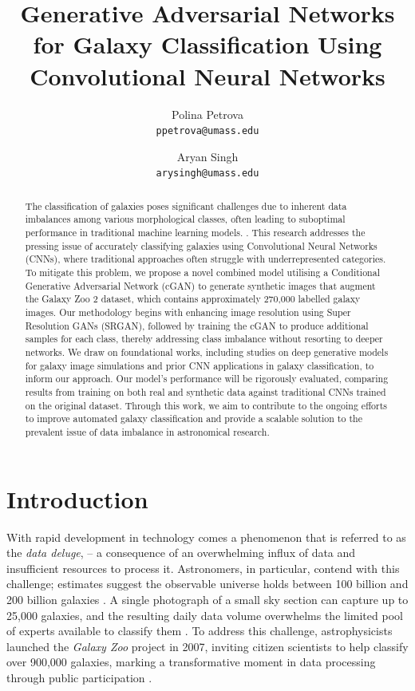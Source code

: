 \documentclass[10pt,twocolumn,letterpaper]{article}
\title{Generative Adversarial Networks for Galaxy Classification Using Convolutional
Neural Networks}
\author{Polina Petrova\\
{\tt\small ppetrova@umass.edu}
\and
Aryan Singh\\
{\tt\small arysingh@umass.edu}
}
\begin{document}
\maketitle
\begin{abstract}
    The classification of galaxies poses significant challenges due to inherent data imbalances among various morphological classes, often leading to suboptimal performance in traditional machine learning models. . 
    This research addresses the pressing issue of accurately classifying galaxies using Convolutional Neural Networks (CNNs), where traditional approaches often struggle with underrepresented categories. 
    To mitigate this problem, we propose a novel combined model utilising a Conditional Generative Adversarial Network (cGAN) to generate synthetic images that augment the Galaxy Zoo 2 dataset, which contains approximately 270,000 labelled galaxy images. 
    Our methodology begins with enhancing image resolution using Super Resolution GANs (SRGAN), followed by training the cGAN to produce additional samples for each class, thereby addressing class imbalance without resorting to deeper networks. 
    We draw on foundational works, including studies on deep generative models for galaxy image simulations and prior CNN applications in galaxy classification, to inform our approach. 
    Our model's performance will be rigorously evaluated, comparing results from training on both real and synthetic data against traditional CNNs trained on the original dataset. 
    Through this work, we aim to contribute to the ongoing efforts to improve automated galaxy classification and provide a scalable solution to the prevalent issue of data imbalance in astronomical research.
\end{abstract}

\section{Introduction}
With rapid development in technology comes a phenomenon that is referred to as the \textit{data deluge}, – a consequence of an overwhelming influx of data and insufficient resources to process it. 
Astronomers, in particular, contend with this challenge; estimates suggest the observable universe holds between 100 billion and 200 billion galaxies \cite{Howell2018}.
A single photograph of a small sky section can capture up to 25,000 galaxies, and the resulting daily data volume overwhelms the limited pool of experts available to classify them \cite{Sauers2023}.
To address this challenge, astrophysicists launched the \textit{Galaxy Zoo} project in 2007, inviting citizen scientists to help classify over 900,000 galaxies, marking a transformative moment in data processing through public participation \cite{McGourty2007}.
\end{document}
